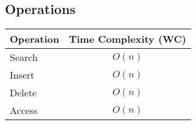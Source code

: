 \subsection{Operations}
\begin{summary}
    \begin{center}
        \begin{tabular}{lc}
            \toprule
            \textbf{Operation} & \textbf{Time Complexity (WC)} \\
            \midrule
            Search & $O(n)$ \\
            Insert & $O(n)$ \\
            Delete & $O(n)$ \\
            Access & $O(n)$ \\
            \bottomrule
        \end{tabular}
    \end{center}
\end{summary}
\newpage

